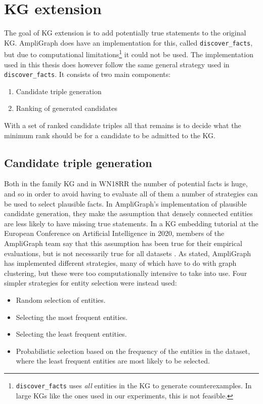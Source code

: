 


\newpage

\section{KG extension}

The goal of KG extension is to add potentially true statements to the original KG. AmpliGraph does have an implementation for this, called \texttt{discover\_facts}, but due to computational limitations\footnote{\texttt{discover\_facts} uses \textit{all} entities in the KG to generate counterexamples. In large KGs like the ones used in our experiments, this is not feasible.} it could not be used.
The implementation used in this thesis does however follow the same general strategy used in \texttt{discover\_facts}. It consists of two main components:
\begin{enumerate}
    \item Candidate triple generation
    \item Ranking of generated candidates
\end{enumerate}
With a set of ranked candidate triples all that remains is to decide what the minimum rank should be for a candidate to be admitted to the KG.


\subsection{Candidate triple generation}
\label{canidate_triple_generation}
Both in the family KG and in WN18RR the number of potential facts is huge, and so in order to avoid having to evaluate all of them a number of strategies can be used to select plausible facts. In AmpliGraph's implementation of plausible candidate generation, they make the assumption that densely connected entities are less likely to have missing true statements. In a KG embedding tutorial at the European Conference on Artificial Intelligence in 2020, members of the AmpliGraph team say that this assumption has been true for their empirical evaluations, but is not necessarily true for all datasets \cite{kge_tutorial}.  As stated, AmpliGraph has implemented different strategies, many of which have to do with graph clustering, but these were too computationally intensive to take into use. Four simpler strategies for entity selection were instead used:
\begin{itemize}
    \item Random selection of entities.
    \item Selecting the most frequent entities.
    \item Selecting the least frequent entities.
    \item Probabilistic selection based on the frequency of the entities in the dataset, where the least frequent entities are most likely to be selected.
\end{itemize}

